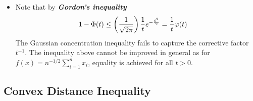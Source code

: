 \documentclass[11pt]{article}
\begin{document}
\begin{itemize}
\item \begin{remark}
Note that by \emph{\textbf{Gordon's inequality}}
\begin{align*}
1 - \Phi(t) &\le \left(\frac{1}{\sqrt{2\pi}}\right)\frac{1}{t} e^{-\frac{t^2}{2}} = \frac{1}{t}\varphi(t)
\end{align*} The Gaussian concentration inequality fails to capture the corrective factor $t^{-1}$. The inequality above cannot be improved in general as for $f(x) = n^{-1/2}\sum_{i=1}^n x_i$, equality is achieved for all $t > 0$.
\end{remark}
\end{itemize}
\subsection{Convex Distance Inequality}
\end{document}
